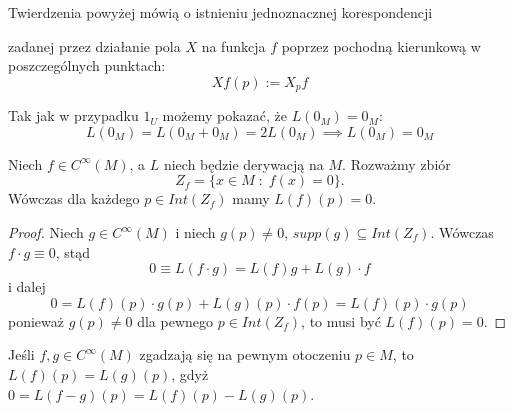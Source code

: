 Twierdzenia powyżej mówią o istnieniu jednoznacznej korespondencji

\begin{center}\end{center}
zadanej przez działanie pola $X$ na funkcja $f$ poprzez pochodną kierunkową w poszczególnych punktach:
$$Xf(p):=X_pf$$

Tak jak w przypadku $1_U$ możemy pokazać, że $L(0_M)=0_M$:
$$L(0_M)=L(0_M+0_M)=2L(0_M)\implies L(0_M)=0_M$$

\begin{lemma}
  Niech $f\in C^\infty(M)$, a $L$ niech będzie derywacją na $M$. Rozważmy zbiór
  $$Z_f=\{x\in M\;:\;f(x)=0\}.$$
  Wówczas dla każdego $p\in Int(Z_f)$ mamy $L(f)(p)=0$.
\end{lemma}

\begin{proof}
  Niech $g\in C^\infty(M)$ i niech $g(p)\neq 0$, $supp(g)\subseteq Int(Z_f)$. Wówczas $f\cdot g\equiv 0$, stąd
  $$0\equiv L(f\cdot g)=L(f)g+L(g)\cdot f$$
  i dalej
  $$0=L(f)(p)\cdot g(p)+L(g)(p)\cdot f(p)=L(f)(p)\cdot g(p)$$
  ponieważ $g(p)\neq 0$ dla pewnego $p\in Int(Z_f)$, to musi być $L(f)(p)=0$.
\end{proof}

Jeśli $f,g\in C^\infty(M)$ zgadzają się na pewnym otoczeniu $p\in M$, to $L(f)(p)=L(g)(p)$, gdyż $0=L(f-g)(p)=L(f)(p)-L(g)(p)$.

